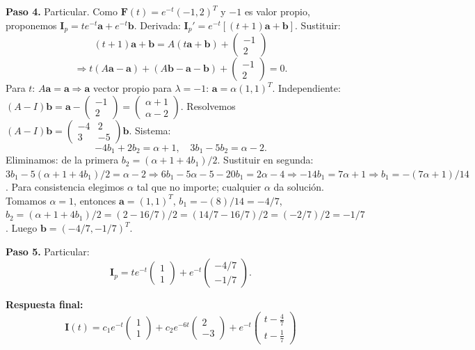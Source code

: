 \begin{example}
\begin{myproof}
\textbf{Paso 4.} Particular. Como $\mathbf{F}(t)=e^{-t}(-1,2)^T$ y $-1$ es valor propio, proponemos $\mathbf{I}_p=t e^{-t}\mathbf{a}+e^{-t}\mathbf{b}$.
Derivada: $\mathbf{I}_p'=e^{-t}[(t+1)\mathbf{a}+\mathbf{b}]$.
Sustituir:
\[
(t+1)\mathbf{a}+\mathbf{b}=A(t\mathbf{a}+\mathbf{b})+\begin{pmatrix}-1\\2\end{pmatrix}
\]
\[
\Rightarrow t(A\mathbf{a}-\mathbf{a})+(A\mathbf{b}-\mathbf{a}-\mathbf{b})+\begin{pmatrix}-1\\2\end{pmatrix}=0.
\]
Para $t$: $A\mathbf{a}=\mathbf{a}\Rightarrow \mathbf{a}$ vector propio para $\lambda=-1$: $\mathbf{a}=\alpha(1,1)^T$.
Independiente: $(A-I)\mathbf{b} = \mathbf{a} - \begin{pmatrix}-1\\2\end{pmatrix}
= \begin{pmatrix}\alpha+1\\ \alpha-2\end{pmatrix}$.
Resolvemos $(A-I)\mathbf{b}=
\begin{pmatrix}
-4&2\\
3&-5
\end{pmatrix}\mathbf{b}$.
Sistema:
\[
-4b_1+2b_2=\alpha+1,\quad 3b_1-5b_2=\alpha-2.
\]
Eliminamos: de la primera $b_2=(\alpha+1+4b_1)/2$. Sustituir en segunda:
$3b_1-5(\alpha+1+4b_1)/2=\alpha-2\Rightarrow 6b_1-5\alpha-5-20b_1=2\alpha-4\Rightarrow -14b_1=7\alpha+1\Rightarrow b_1=-(7\alpha+1)/14$.
Para consistencia elegimos $\alpha$ tal que no importe; cualquier $\alpha$ da solución. Tomamos $\alpha=1$, entonces $\mathbf{a}=(1,1)^T$,
$b_1=-(8)/14=-4/7$, $b_2=(\alpha+1+4b_1)/2=(2-16/7)/2=(14/7-16/7)/2=(-2/7)/2=-1/7$.
Luego $\mathbf{b}=(-4/7,-1/7)^T$.

\textbf{Paso 5.} Particular:
\[
\mathbf{I}_p=t e^{-t}\begin{pmatrix}1\\1\end{pmatrix}+e^{-t}\begin{pmatrix}-4/7\\-1/7\end{pmatrix}.
\]

\textbf{Respuesta final:}
\[
\boxed{
\mathbf{I}(t)=c_1 e^{-t}
\begin{pmatrix}
1\\1
\end{pmatrix}
+c_2 e^{-6t}
\begin{pmatrix}
2\\-3
\end{pmatrix}
+
e^{-t}
\begin{pmatrix}
t-\frac47\\
t-\frac17
\end{pmatrix}
}
\]
\end{myproof}
\end{example}

